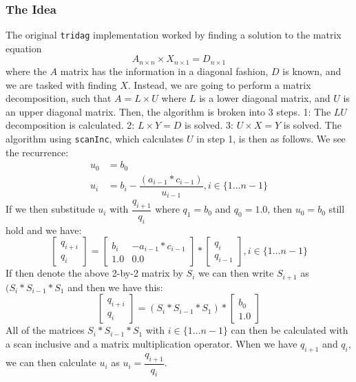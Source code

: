 \documentclass[12pt, oneside]{article}
\begin{document}
\subsubsection{The Idea}
The original \texttt{tridag} implementation worked by finding a solution to the matrix equation \[A_{n\times n}\times X_{n \times 1} = D_{n \times 1}\]
where the \(A\) matrix has the information in a diagonal fashion, \(D\) is known, and we are tasked with finding \(X\). Instead, we are going to perform a matrix decomposition, such that \(A = L \times U\) where \(L\) is a lower diagonal matrix, and \(U\) is an upper diagonal matrix. Then, the algorithm is broken into 3 steps. 1: The \(LU\) decomposition is calculated. 2: \(L \times Y = D\) is solved. 3: \(U \times X = Y\) is solved. The algorithm using \texttt{scanInc}, which calculates \(U\) in step 1, is then as follows.
We see the recurrence:
\begin{align}
    u_0 &= b_0 \\
    u_i &= b_i - \dfrac{(a_{i - 1} * c_{i - 1})}{u_{i-1}}, i \in \{1 \ldots n-1\}
\end{align}
If we then substitude $u_i$ with $\dfrac{q_{i+1}}{q_i}$ where $q_1 = b_0$ and
$q_0 = 1.0$, then $u_0 = b_0$ still hold and we have:
\begin{equation}
    \begin{bmatrix}
        q_{i+i} \\
        q_i
    \end{bmatrix}
    =
    \begin{bmatrix}
        b_i & -a_{i - 1} * c_{i - 1} \\
        1.0 & 0.0
    \end{bmatrix}
    *
    \begin{bmatrix}
        q_{i} \\
        q_{i - 1}
    \end{bmatrix}
    , i \in \{1 \ldots n-1\}
\end{equation}
If then denote the above 2-by-2 matrix by $S_i$ we can then write $S_{i + 1}$ as
$(S_i * S_{i - 1} * S_1$ and then we have this:
\begin{equation}
    \begin{bmatrix}
        q_{i+i} \\
        q_i
    \end{bmatrix}
    =
    (S_i * S_{i - 1} * S_1)
    *
    \begin{bmatrix}
        b_{0} \\
        1.0
    \end{bmatrix}
\end{equation}
All of the matrices $S_i * S_{i - 1} * S_1$ with $i \in \{1 \ldots n-1\}$ can
then be calculated with a scan inclusive and a matrix multiplication operator.
When we have $q_{i+1}$ and $q_i$, we can then calculate $u_i$ as
$u_i = \dfrac{q_{i+1}}{q_i}$.
\end{document}
